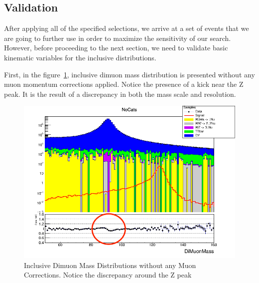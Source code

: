 \subsection{Validation}
After applying all of the specified selections, we arrive at a set of events that we are going to further use in order to maximize the sensitivity of our search. However, before proceeding to the next section, we need to validate basic kinematic variables for the inclusive distributions.

First, in the figure~\ref{fig:higgs_selections_inclusivemassnocorr}, inclusive dimuon mass distribution is presented without any muon momentum corrections applied. Notice the presence of a kick near the Z peak. It is the result of a discrepancy in both the mass scale and resolution.
\begin{figure}[!h]
  \centering
  \includegraphics[width=0.5\linewidth]{figures/ch_higgs/distributions/baseline_nocorrections/distribution__NoCats__DiMuonMass__logY.png}
  \caption{Inclusive Dimuon Mass Distributions without any Muon Corrections. Notice the discrepancy around the Z peak}
  \label{fig:higgs_selections_inclusivemassnocorr}
\end{figure}


